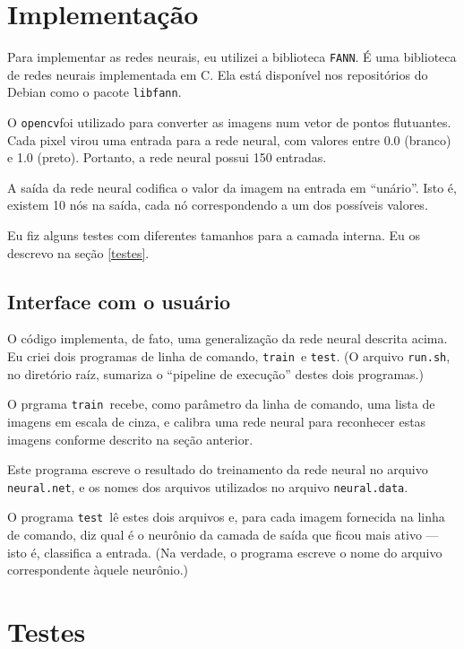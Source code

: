 \documentclass{article}
\newcommand{\FANN}{{\lstinline"FANN"}}
\newcommand{\opencv}{{\lstinline"opencv"}}
\newcommand{\train}{{\lstinline"train"}}
\newcommand{\test}{{\lstinline"test"}}
\begin{document}
\section{Implementação}

Para implementar as redes neurais, eu utilizei a biblioteca \FANN.
É uma biblioteca de redes neurais implementada em C.
Ela está disponível nos repositórios do Debian como o pacote \lstinline"libfann".

O \opencv foi utilizado para converter as imagens num vetor de pontos flutuantes.
Cada pixel virou uma entrada para a rede neural,
com valores entre 0.0 (branco) e 1.0 (preto).
Portanto, a rede neural possui 150 entradas.

A saída da rede neural codifica o valor da imagem na entrada em ``unário''.
Isto é, existem 10 nós na saída, cada nó correspondendo a um dos possíveis valores.

Eu fiz alguns testes com diferentes tamanhos para a camada interna.
Eu os descrevo na seção \ref{testes}.

\subsection{Interface com o usuário}

O código implementa, de fato, uma generalização da rede neural descrita acima.
Eu criei dois programas de linha de comando, \train\ e \test.
(O arquivo \lstinline"run.sh", no diretório raíz,
sumariza o ``pipeline de execução'' destes dois programas.)

O prgrama \train\ recebe, como parâmetro da linha de comando,
uma lista de imagens em escala de cinza,
e calibra uma rede neural para reconhecer estas imagens
conforme descrito na seção anterior.

Este programa escreve o resultado do treinamento da rede neural
no arquivo \lstinline"neural.net",
e os nomes dos arquivos utilizados no arquivo \lstinline"neural.data".

O programa \test\ lê estes dois arquivos e,
para cada imagem fornecida na linha de comando,
diz qual é o neurônio da camada de saída que ficou mais ativo
--- isto é, classifica a entrada.
(Na verdade, o programa escreve o nome do arquivo correspondente àquele neurônio.)

\section{Testes \label{testes}}
\end{document}
